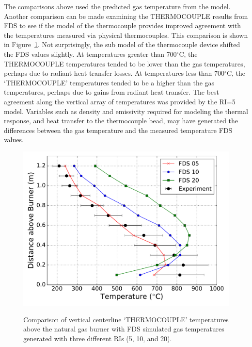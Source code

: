 \documentclass[twoside]{uocthesis}
\begin{document}
{The comparisons above used the predicted gas temperature from the model. Another comparison can be made examining the THERMOCOUPLE results from FDS to see if the model of the thermocouple provides improved agreement with the temperatures measured via physical thermocouples.  This comparison is shown in Figure~\ref{FHNG01_RI_TC}.  Not surprisingly, the sub model of the thermocouple device shifted the FDS values slightly.  At temperatures greater than 700$^\circ$C, the THERMOCOUPLE temperatures tended to be lower than the gas temperatures, perhaps due to radiant heat transfer losses. At temperatures less than 700$^\circ$C, the `THERMOCOUPLE' temperatures tended to be a higher than the gas temperatures, perhaps due to gains from radiant heat transfer.  The best agreement along the vertical array of temperatures was provided by the RI=5 model.  Variables such as density and emissivity required for modeling the thermal response, and heat transfer to the thermocouple bead, may have generated the differences between the gas temperature and the measured temperature FDS values.  

\begin{figure}[h]
	\includegraphics[width=5in]{../Figures/FHNG01_RI_TC} \\
	\caption[Comparison of vertical centerline THERMOCOUPLE temperatures above the natural gas burner with FDS simulated gas temperatures.]{Comparison of vertical centerline `THERMOCOUPLE' temperatures above the natural gas burner with FDS simulated gas temperatures generated with three different RIs (5, 10, and 20).}
	\label{FHNG01_RI_TC}
\end{figure}

}
\end{document}
